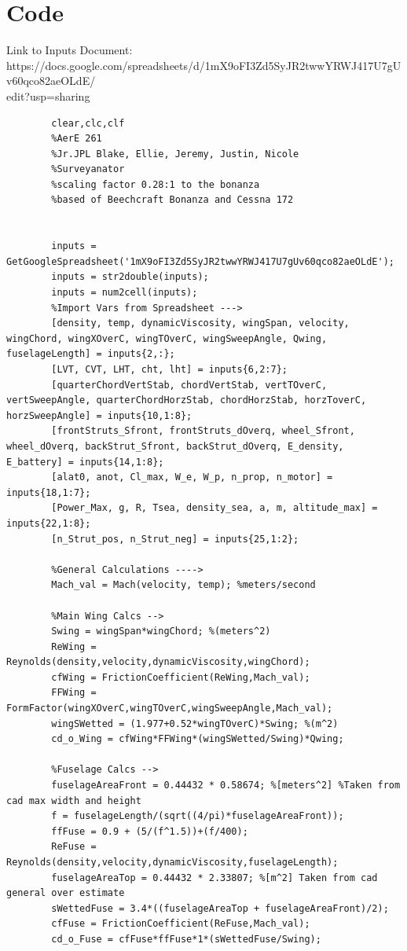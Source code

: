 \documentclass[12pt,A4paper]{article}
\begin{document}
	\section{Code}
	\begin{center}
	Link to Inputs Document: https://docs.google.com/spreadsheets/d/1mX9oFI3Zd5SyJR2twwYRWJ417U7gUv60qco82aeOLdE/\\edit?usp=sharing \\
	\end{center}
	\begin{lstlisting}
		clear,clc,clf
		%AerE 261
		%Jr.JPL Blake, Ellie, Jeremy, Justin, Nicole
		%Surveyanator
		%scaling factor 0.28:1 to the bonanza
		%based of Beechcraft Bonanza and Cessna 172
		
		
		inputs = GetGoogleSpreadsheet('1mX9oFI3Zd5SyJR2twwYRWJ417U7gUv60qco82aeOLdE');
		inputs = str2double(inputs);
		inputs = num2cell(inputs);
		%Import Vars from Spreadsheet --->
		[density, temp, dynamicViscosity, wingSpan, velocity, wingChord, wingXOverC, wingTOverC, wingSweepAngle, Qwing, fuselageLength] = inputs{2,:};
		[LVT, CVT, LHT, cht, lht] = inputs{6,2:7};
		[quarterChordVertStab, chordVertStab, vertTOverC, vertSweepAngle, quarterChordHorzStab, chordHorzStab, horzToverC, horzSweepAngle] = inputs{10,1:8};
		[frontStruts_Sfront, frontStruts_dOverq, wheel_Sfront, wheel_dOverq, backStrut_Sfront, backStrut_dOverq, E_density, E_battery] = inputs{14,1:8};
		[alat0, anot, Cl_max, W_e, W_p, n_prop, n_motor] = inputs{18,1:7};
		[Power_Max, g, R, Tsea, density_sea, a, m, altitude_max] = inputs{22,1:8};
		[n_Strut_pos, n_Strut_neg] = inputs{25,1:2};
		
		%General Calculations ---->
		Mach_val = Mach(velocity, temp); %meters/second
		
		%Main Wing Calcs -->
		Swing = wingSpan*wingChord; %(meters^2)
		ReWing = Reynolds(density,velocity,dynamicViscosity,wingChord);
		cfWing = FrictionCoefficient(ReWing,Mach_val);
		FFWing = FormFactor(wingXOverC,wingTOverC,wingSweepAngle,Mach_val);
		wingSWetted = (1.977+0.52*wingTOverC)*Swing; %(m^2)
		cd_o_Wing = cfWing*FFWing*(wingSWetted/Swing)*Qwing;
		
		%Fuselage Calcs -->
		fuselageAreaFront = 0.44432 * 0.58674; %[meters^2] %Taken from cad max width and height
		f = fuselageLength/(sqrt((4/pi)*fuselageAreaFront)); 
		ffFuse = 0.9 + (5/(f^1.5))+(f/400);
		ReFuse = Reynolds(density,velocity,dynamicViscosity,fuselageLength);
		fuselageAreaTop = 0.44432 * 2.33807; %[m^2] Taken from cad general over estimate
		sWettedFuse = 3.4*((fuselageAreaTop + fuselageAreaFront)/2);
		cfFuse = FrictionCoefficient(ReFuse,Mach_val);
		cd_o_Fuse = cfFuse*ffFuse*1*(sWettedFuse/Swing);
		

\end{lstlisting}
\end{document}
